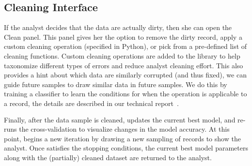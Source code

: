 \subsection{Cleaning Interface}
If the analyst decides that the data are actually dirty, then she can open the \textsf{Clean} panel.
This panel gives her the option to remove the dirty record, apply a custom cleaning operation (specified in Python), or pick from a pre-defined list of cleaning functions.
Custom cleaning operations are added to the library to help taxonomize different types of errors and reduce analyst cleaning effort.
This also provides a hint about which data are similarly corrupted (and thus fixed), we can guide future samples to draw similar data in future samples.
We do this by training a classifier to learn the conditions for when the operation is applicable to a record, the details are described in our technical report~\cite{activecleanarxiv}.

Finally, after the data sample is cleaned, \sys updates the current best model, and re-runs the cross-validation to visualize changes in the model accuracy.
At this point, \sys begins a new iteration by drawing a new sampling of records to show the analyst.  
Once \sys satisfies the stopping conditions, the current best model parameters along with the (partially) cleaned dataset are returned to the analyst.
